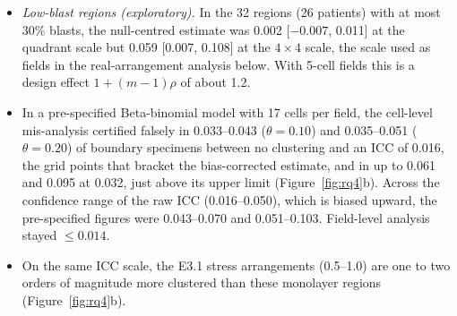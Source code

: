 \documentclass[11pt]{article}
\theoremstyle{remark}
\theoremstyle{definition}
\begin{document}
\begin{itemize}
\item \emph{Low-blast regions (exploratory).} In the 32 regions (26 patients) with at most 30\% blasts, the null-centred estimate was 0.002 [$-0.007$, 0.011] at the quadrant scale but 0.059 [0.007, 0.108] at the $4\times4$ scale, the scale used as fields in the real-arrangement analysis below. With 5-cell fields this is a design effect $1+(m-1)\rho$ \cite{kish1965} of about 1.2.
\item In a pre-specified Beta-binomial model with 17 cells per field, the cell-level mis-analysis certified falsely in 0.033--0.043 ($\theta=0.10$) and 0.035--0.051 ($\theta=0.20$) of boundary specimens between no clustering and an ICC of 0.016, the grid points that bracket the bias-corrected estimate, and in up to 0.061 and 0.095 at 0.032, just above its upper limit (Figure~\ref{fig:rq4}b). Across the confidence range of the raw ICC (0.016--0.050), which is biased upward, the pre-specified figures were 0.043--0.070 and 0.051--0.103. Field-level analysis stayed $\le0.014$.
\item On the same ICC scale, the E3.1 stress arrangements (0.5--1.0) are one to two orders of magnitude more clustered than these monolayer regions (Figure~\ref{fig:rq4}b).
\end{itemize}
\end{document}
